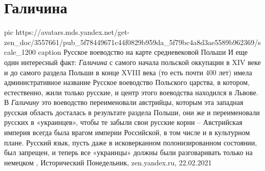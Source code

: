  
 
 
 
 
\chapter{Галичина}

\ifcmt
  pic https://avatars.mds.yandex.net/get-zen_doc/3557661/pub_5f78449671c44f0829b959da_5f79bc4a8d3ae5589b962369/scale_1200
	caption Русское воеводство на карте средневековой Польши
\fi
И еще один интересный факт: \emph{Галичина} с самого начала польской оккупации в XIV
веке и до самого раздела Польши в конце XVIII века (то есть почти 400 лет)
имела административное название Русское воеводство Польского царства, в
котором, естественно, жили только русские, и центр этого воеводства находился в
Львове. В \emph{Галичину} это воеводство переименовали австрийцы, которым эта западная
русская область досталась в результате раздела Польши, они же и переименовали
русских в «украинцев», чтобы те забыли свои русские корни – Австрийская империя
всегда была врагом империи Российской, в том числе и в культурном плане.
Русский язык, пусть даже в исковерканном полонизированном состоянии, был
запрещен, и теперь все «украинцы» должны были разговаривать только на немецком
, 
Исторический Понедельник, zen.yandex.ru, 22.02.2021 

